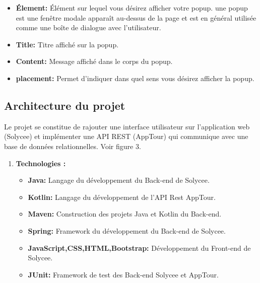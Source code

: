 \documentclass[12pt]{article}
\begin{document}
\begin{itemize}
\item \textbf{Élement: } Élément sur lequel vous désirez afficher votre popup. une popup est une fenêtre modale apparaît au-dessus de la page et est en général utilisée comme une boîte de dialogue avec l’utilisateur. 
\item \textbf{Title: } Titre affiché sur la popup. 
\item \textbf{Content: } Message affiché dans le corps du popup.
\item \textbf{placement: } Permet d’indiquer dans quel sens vous désirez afficher la popup.
\end{itemize} 



\subsection{Architecture du projet}

Le projet se constitue de rajouter une interface utilisateur sur l'application web (Solycee) et  implémenter une API REST (AppTour) qui communique avec une base de données relationnelles. Voir figure 3.

\begin{enumerate}
\item \textbf{Technologies :}\\

\begin{itemize}
\item \textbf{Java: }Langage du développement du Back-end de Solycee. 
\item \textbf{Kotlin: }Langage du développement de l'API Rest AppTour. 
\item \textbf{Maven: }Construction des projets Java et Kotlin du Back-end.
\item \textbf{Spring: } Framework du développement du Back-end de Solycee.
\item \textbf{JavaScript,CSS,HTML,Bootstrap: } Développement du Front-end de Solycee.
\item \textbf{JUnit: } Framework de test des Back-end Solycee et AppTour. 
\end{itemize} 
\end{enumerate}
\end{document}
